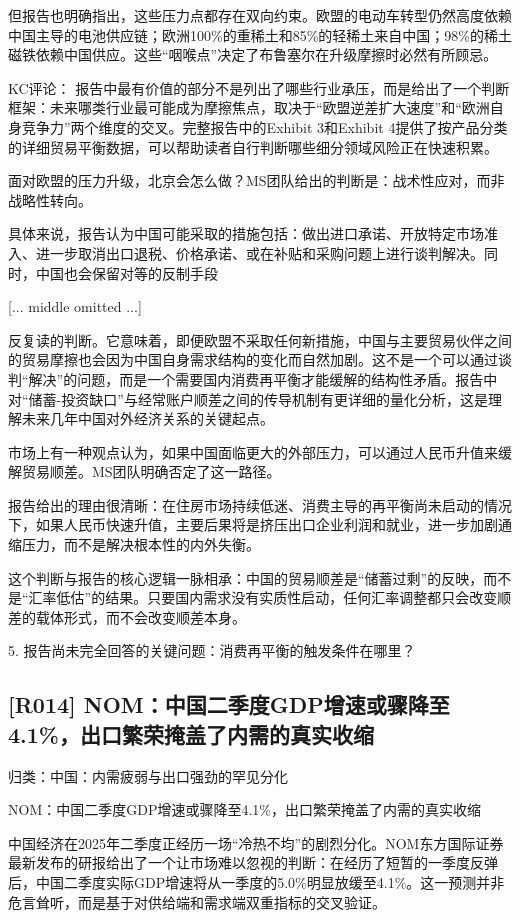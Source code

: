 \documentclass[11pt]{ctexart}
\begin{document}
但报告也明确指出，这些压力点都存在双向约束。欧盟的电动车转型仍然高度依赖中国主导的电池供应链；欧洲100\%的重稀土和85\%的轻稀土来自中国；98\%的稀土磁铁依赖中国供应。这些“咽喉点”决定了布鲁塞尔在升级摩擦时必然有所顾忌。

KC评论： 报告中最有价值的部分不是列出了哪些行业承压，而是给出了一个判断框架：未来哪类行业最可能成为摩擦焦点，取决于“欧盟逆差扩大速度”和“欧洲自身竞争力”两个维度的交叉。完整报告中的Exhibit 3和Exhibit 4提供了按产品分类的详细贸易平衡数据，可以帮助读者自行判断哪些细分领域风险正在快速积累。

面对欧盟的压力升级，北京会怎么做？MS团队给出的判断是：战术性应对，而非战略性转向。

具体来说，报告认为中国可能采取的措施包括：做出进口承诺、开放特定市场准入、进一步取消出口退税、价格承诺、或在补贴和采购问题上进行谈判解决。同时，中国也会保留对等的反制手段

[... middle omitted ...]

反复读的判断。它意味着，即便欧盟不采取任何新措施，中国与主要贸易伙伴之间的贸易摩擦也会因为中国自身需求结构的变化而自然加剧。这不是一个可以通过谈判“解决”的问题，而是一个需要国内消费再平衡才能缓解的结构性矛盾。报告中对“储蓄-投资缺口”与经常账户顺差之间的传导机制有更详细的量化分析，这是理解未来几年中国对外经济关系的关键起点。

市场上有一种观点认为，如果中国面临更大的外部压力，可以通过人民币升值来缓解贸易顺差。MS团队明确否定了这一路径。

报告给出的理由很清晰：在住房市场持续低迷、消费主导的再平衡尚未启动的情况下，如果人民币快速升值，主要后果将是挤压出口企业利润和就业，进一步加剧通缩压力，而不是解决根本性的内外失衡。

这个判断与报告的核心逻辑一脉相承：中国的贸易顺差是“储蓄过剩”的反映，而不是“汇率低估”的结果。只要国内需求没有实质性启动，任何汇率调整都只会改变顺差的载体形式，而不会改变顺差本身。

5. 报告尚未完全回答的关键问题：消费再平衡的触发条件在哪里？

\subsection{[R014] NOM：中国二季度GDP增速或骤降至4.1\%，出口繁荣掩盖了内需的真实收缩}
{\small\color{refgray}归类：中国：内需疲弱与出口强劲的罕见分化}

NOM：中国二季度GDP增速或骤降至4.1\%，出口繁荣掩盖了内需的真实收缩

中国经济在2025年二季度正经历一场“冷热不均”的剧烈分化。NOM东方国际证券最新发布的研报给出了一个让市场难以忽视的判断：在经历了短暂的一季度反弹后，中国二季度实际GDP增速将从一季度的5.0\%明显放缓至4.1\%。这一预测并非危言耸听，而是基于对供给端和需求端双重指标的交叉验证。
\end{document}
